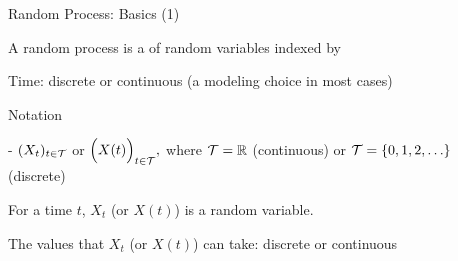 \begin{frame}{Random Process: Basics (1)}

\plitemsep 0.1in
\bci

\item<2-> A random process is a  of random variables indexed by 

\item<3-> Time: discrete or continuous (a modeling choice in most cases)

\item<4-> Notation

- $(X_t)_{t \in \mathcal T}$ or $\Bigl(X(t)\Bigl)_{t \in \mathcal T},$ where $\mathcal T = {\mathbb R}$ (continuous) or $\mathcal T = \{ 0, 1, 2, \ldots \}$ (discrete)



\item<7-> For a  time $t$, $X_t$ (or $X(t)$) is a random variable.

\item<8-> The values that $X_t$ (or $X(t)$) can take: discrete or continuous

\eci

\end{frame}



